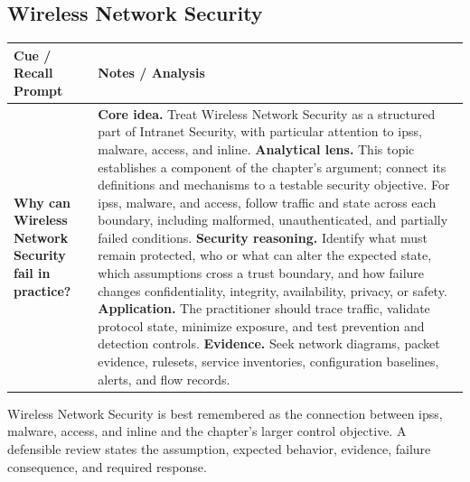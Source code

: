 \documentclass[11pt]{article}
\newcommand{\CornellHeader}{%
\rowcolor{Navy}\color{white}\bfseries Cue / Recall Prompt & \color{white}\bfseries Notes / Analysis\\\hline}
\newcommand{\CornellRow}[2]{%
\cellcolor{CueGray}\RaggedRight\textbf{#1} & \RaggedRight #2\\\hline}
\begin{document}
\subsection*{Wireless Network Security}
\begin{longtable}{>{\RaggedRight\arraybackslash}p{}|>{\RaggedRight\arraybackslash}p{}}
\CornellHeader
\CornellRow{Why can Wireless Network Security fail in practice?}{\textbf{Core idea.} Treat Wireless Network Security as a structured part of Intranet Security, with particular attention to ipss, malware, access, and inline. \textbf{Analytical lens.} This topic establishes a component of the chapter's argument; connect its definitions and mechanisms to a testable security objective. For ipss, malware, and access, follow traffic and state across each boundary, including malformed, unauthenticated, and partially failed conditions. \textbf{Security reasoning.} Identify what must remain protected, who or what can alter the expected state, which assumptions cross a trust boundary, and how failure changes confidentiality, integrity, availability, privacy, or safety. \textbf{Application.} The practitioner should trace traffic, validate protocol state, minimize exposure, and test prevention and detection controls. \textbf{Evidence.} Seek network diagrams, packet evidence, rulesets, service inventories, configuration baselines, alerts, and flow records.}
\end{longtable}
\begin{topicsummary}
Wireless Network Security is best remembered as the connection between ipss, malware, access, and inline and the chapter's larger control objective. A defensible review states the assumption, expected behavior, evidence, failure consequence, and required response.
\end{topicsummary}
\end{document}
